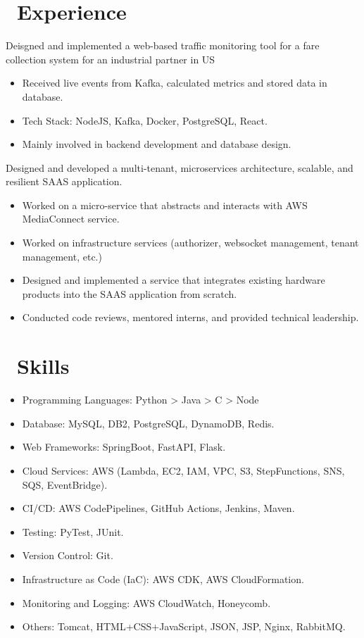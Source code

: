 \documentclass{resume}
\begin{document}
\section{\faUsers\ Experience}
Deisgned and implemented a web-based traffic monitoring tool for a fare collection system for an industrial partner in US
\begin{itemize}
  \item Received live events from Kafka, calculated metrics and stored data in database.
  \item Tech Stack: NodeJS, Kafka, Docker, PostgreSQL, React.
  \item Mainly involved in backend development and database design.
\end{itemize}

 {Designed and developed a multi-tenant, microservices architecture, scalable, and resilient SAAS application.}
\begin{itemize}
  \item Worked on a micro-service that abstracts and interacts with AWS MediaConnect service. 
  \item Worked on infrastructure services (authorizer, websocket management, tenant management, etc.)
  \item Designed and implemented a service that integrates existing hardware products into the SAAS application from scratch.
  \item Conducted code reviews, mentored interns, and provided technical leadership.
\end{itemize}

\section{\faCogs\ Skills}
\begin{itemize}[parsep=0.5ex]
  \item Programming Languages: Python > Java > C > Node
  \item Database: MySQL, DB2, PostgreSQL, DynamoDB, Redis.
  \item Web Frameworks: SpringBoot, FastAPI, Flask.
  \item Cloud Services: AWS (Lambda, EC2, IAM, VPC, S3, StepFunctions, SNS, SQS, EventBridge).
  \item CI/CD: AWS CodePipelines, GitHub Actions, Jenkins, Maven.
  \item Testing: PyTest, JUnit.
  \item Version Control: Git.
  \item Infrastructure as Code (IaC): AWS CDK, AWS CloudFormation.
  \item Monitoring and Logging: AWS CloudWatch, Honeycomb.
  \item Others: Tomcat, HTML+CSS+JavaScript, JSON, JSP, Nginx, RabbitMQ.
\end{itemize}
\end{document}
